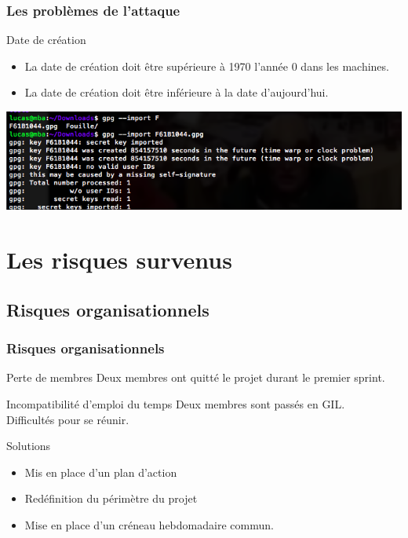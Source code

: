 \begin{frame}
  \frametitle{\color{white}Les problèmes de l'attaque}
  \begin{block}{Date de création}
      \begin{itemize}
        \item La date de création doit être supérieure à 1970 l'année 0 dans les machines.
        \item La date de création doit être inférieure à la date d'aujourd'hui.
      \end{itemize}
    \end{block}
    \medbreak
    \includegraphics[scale=0.42]{attaque.png}
\end{frame}


\section{Les risques survenus}
  \subsection{Risques organisationnels}
    \begin{frame}
      \frametitle{\color{white}Risques organisationnels}
      \begin{block}{Perte de membres}
        Deux membres ont quitté le projet durant le premier sprint.
      \end{block}
      \begin{block}{Incompatibilité d'emploi du temps}
        Deux membres sont passés en GIL.\\
        Difficultés pour se réunir.
      \end{block}
      \pause
      \begin{exampleblock}{Solutions}
        \begin{itemize}
          \item Mis en place d'un plan d'action
          \item Redéfinition du périmètre du projet
          \item Mise en place d'un créneau hebdomadaire commun.
        \end{itemize}
      \end{exampleblock}
    \end{frame}

